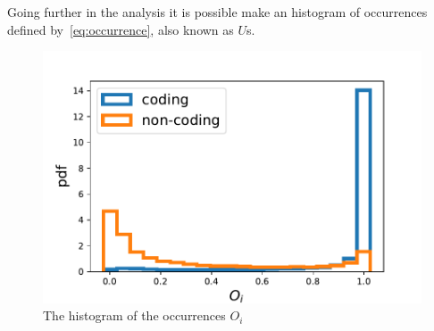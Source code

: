 Going further in the analysis it is possible make an histogram of occurrences defined by~\ref{eq:occurrence}, also known as $U$s.
\begin{figure}[htb!]
    \centering
    \includegraphics[width=0.9\linewidth]{pictures/structure/gtex/U_gtex_cnc.pdf}
    \caption{The histogram of the occurrences $O_i$}
    \label{fig:structure/gtex/U_cnc}
\end{figure}

